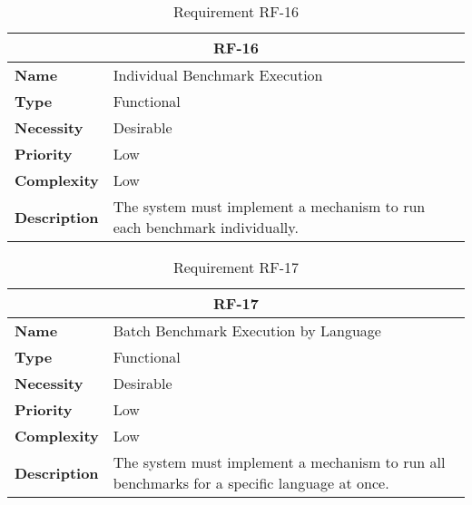 \begin{table}[H]
    \centering
    \begin{tabular}{l p{10cm}}
        \toprule
        \multicolumn{2}{c}{\textbf{RF-16}} \\
        \toprule
        \textbf{Name}               & Individual Benchmark Execution \\
        \textbf{Type}               & Functional \\
        \textbf{Necessity}          & Desirable \\
        \textbf{Priority}           & Low \\
        \textbf{Complexity}         & Low \\
        \textbf{Description}        & The system must implement a mechanism to run each benchmark individually. \\
        \bottomrule
    \end{tabular}
\caption{Requirement RF-16}\label{tab:rf-16}
\end{table}

\begin{table}[H]
    \centering
    \begin{tabular}{l p{10cm}}
        \toprule
        \multicolumn{2}{c}{\textbf{RF-17}} \\
        \toprule
        \textbf{Name}               & Batch Benchmark Execution by Language \\
        \textbf{Type}               & Functional \\
        \textbf{Necessity}          & Desirable \\
        \textbf{Priority}           & Low \\
        \textbf{Complexity}         & Low \\
        \textbf{Description}        & The system must implement a mechanism to run all benchmarks for a specific language at once. \\
        \bottomrule
    \end{tabular}
\caption{Requirement RF-17}\label{tab:rf-17}
\end{table}

